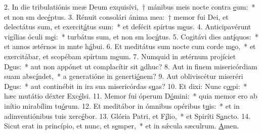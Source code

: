 2. In die tribulatiónis meæ Deum exquisívi,~† mánibus meis nocte contra \uline{e}um:~* et non sm dec\uline{é}ptus.
3. Rénuit consolári ánima mea:~† memor fui Dei, et delectátus sum, et exercit\uline{á}tus sum:~* et defécit spírtus m\uline{e}us.
4. Anticipavérunt vigílias óculi m\uline{e}i:~* turbátus sum, et non sm loc\uline{ú}tus.
5. Cogitávi dies ant\uline{í}quos:~* et annos ætérnos in mnte h\uline{á}bui.
6. Et meditátus sum nocte cum corde m\uline{e}o,~* et exercitábar, et scopébam spírtum m\uline{e}um.
7. Numquid in ætérnum projíciet D\uline{e}us:~* aut non appónet ut complacítir sit \uline{a}dhuc?
8. Aut in finem misericórdiam suam absc\uline{í}ndet,~* a generatióne in generti\uline{ó}nem?
9. Aut obliviscétur miseréri D\uline{e}us:~* aut continébit in ira sua misericórdas s\uline{u}as?
10. Et dixi: Nunc c\uline{œ}pi:~* hæc mutátio déxter Exc\uline{é}lsi.
11. Memor fui óperum D\uline{ó}mini:~* quia memor ero ab inítio mirabílim tu\uline{ó}rum.
12. Et meditábor in ómnibus opéribus t\uline{u}is:~* et in adinventiónibus tuis xerc\uline{é}bor.
13. Glória Patri, et F\uline{í}lio,~* et Spiríti S\uline{a}ncto.
14. Sicut erat in princípio, et nunc, et s\uline{e}mper,~* et in sǽcula sæculrum. \uline{A}men.
